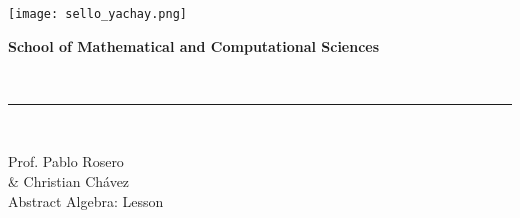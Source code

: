 \noindent
\begin{minipage}[c]{0.3\textwidth}
    \texttt{[image: sello\_yachay.png]}
\end{minipage}
\begin{minipage}[c]{0.35\textwidth}
    \textbf{\large School of Mathematical and Computational Sciences}
\end{minipage}
~ 
\begin{minipage}[c]{2mm}
    \raggedleft
    \rule[1.5mm]{0.3mm}{15mm}
\end{minipage}
~ 
\begin{minipage}[c]{0.3\textwidth}
    Prof. Pablo Rosero\\
    \& Christian Chávez\\
    Abstract Algebra: Lesson \contador{}
\end{minipage}

\vspace{1mm}
\noindent\hrulefill

\vspace{3mm}